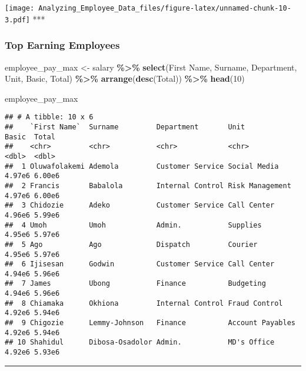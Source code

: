 \documentclass[
]{article}
\newenvironment{Shaded}{\begin{snugshade}}{\end{snugshade}}
\newcommand{\AttributeTok}[1]{\textcolor[rgb]{0.13,0.29,0.53}{#1}}
\newcommand{\DecValTok}[1]{\textcolor[rgb]{0.00,0.00,0.81}{#1}}
\newcommand{\FunctionTok}[1]{\textcolor[rgb]{0.13,0.29,0.53}{\textbf{#1}}}
\newcommand{\NormalTok}[1]{#1}
\newcommand{\OtherTok}[1]{\textcolor[rgb]{0.56,0.35,0.01}{#1}}
\newcommand{\SpecialCharTok}[1]{\textcolor[rgb]{0.81,0.36,0.00}{\textbf{#1}}}
\newcommand{\StringTok}[1]{\textcolor[rgb]{0.31,0.60,0.02}{#1}}
\begin{document}
\texttt{[image: Analyzing\_Employee\_Data\_files/figure-latex/unnamed-chunk-10-3.pdf]}
***

\subsubsection{Top Earning Employees}\label{top-earning-employees}

\begin{Shaded}
\begin{Highlighting}[]
\NormalTok{employee\_pay\_max }\OtherTok{\textless{}{-}}\NormalTok{  salary }\SpecialCharTok{\%\textgreater{}\%} 
  \FunctionTok{select}\NormalTok{(}\StringTok{\textasciigrave{}}\AttributeTok{First Name}\StringTok{\textasciigrave{}}\NormalTok{,}
\NormalTok{         Surname,}
\NormalTok{         Department,}
\NormalTok{         Unit,}
\NormalTok{         Basic,}
\NormalTok{         Total) }\SpecialCharTok{\%\textgreater{}\%} 
  \FunctionTok{arrange}\NormalTok{(}\FunctionTok{desc}\NormalTok{(Total)) }\SpecialCharTok{\%\textgreater{}\%} 
  \FunctionTok{head}\NormalTok{(}\DecValTok{10}\NormalTok{)}

\NormalTok{employee\_pay\_max}
\end{Highlighting}
\end{Shaded}

\begin{verbatim}
## # A tibble: 10 x 6
##    `First Name`  Surname         Department       Unit              Basic  Total
##    <chr>         <chr>           <chr>            <chr>             <dbl>  <dbl>
##  1 Oluwafolakemi Ademola         Customer Service Social Media     4.97e6 6.00e6
##  2 Francis       Babalola        Internal Control Risk Management  4.97e6 6.00e6
##  3 Chidozie      Adeko           Customer Service Call Center      4.96e6 5.99e6
##  4 Umoh          Umoh            Admin.           Supplies         4.95e6 5.97e6
##  5 Ago           Ago             Dispatch         Courier          4.95e6 5.97e6
##  6 Ijisesan      Godwin          Customer Service Call Center      4.94e6 5.96e6
##  7 James         Ubong           Finance          Budgeting        4.94e6 5.96e6
##  8 Chiamaka      Okhiona         Internal Control Fraud Control    4.92e6 5.94e6
##  9 Chigozie      Lemmy-Johnson   Finance          Account Payables 4.92e6 5.94e6
## 10 Shahidul      Dibosa-Osadolor Admin.           MD's Office      4.92e6 5.93e6
\end{verbatim}

\begin{center}\rule{0.5\linewidth}{0.5pt}\end{center}
\end{document}
